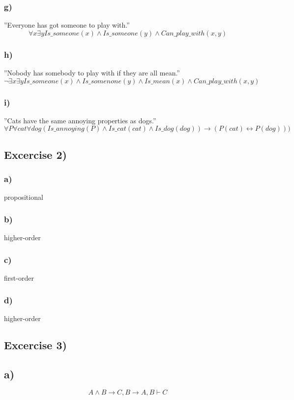 \documentclass[12pt]{article}
\begin{document}
\subsubsection*{g)}
”Everyone has got someone to play with.”
\begin{equation}
  \forall x \exists y Is\_someone(x) \land Is\_someone(y) \land Can\_play\_with(x, y)
\end{equation}
\subsubsection*{h)}
”Nobody has somebody to play with if they are all mean.”
\begin{equation}
  \neg \exists x \exists y Is\_someone(x) \land Is\_somenone(y) \land Is\_mean(x) \land Can\_play\_with(x, y)
\end{equation}
\subsubsection*{i)}
”Cats have the same annoying properties as dogs.”
\begin{equation}
  \forall P \forall cat \forall dog (Is\_annoying(P) \land Is\_cat(cat) \land Is\_dog(dog)) \rightarrow  (P(cat) \leftrightarrow P(dog)))
\end{equation}
\subsection*{Excercise 2)}
\subsubsection*{a)}
propositional
\subsubsection*{b)}
higher-order
\subsubsection*{c)}
first-order
\subsubsection*{d)}
higher-order
\subsection*{Excercise 3)}
\subsection*{a)}
\begin{equation}
  A \land B \rightarrow C, B \rightarrow A, B \vdash C
\end{equation}
\end{document}
